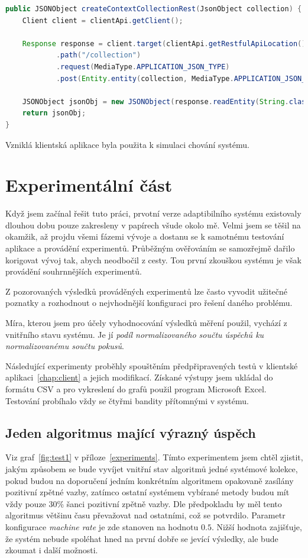 \documentclass[thesis=M,czech]{FITthesis}[2014/05/07]
\begin{document}
\begin{lstlisting}[language=java]
public JSONObject createContextCollectionRest(JsonObject collection) {
    Client client = clientApi.getClient();

    Response response = client.target(clientApi.getRestfulApiLocation())
            .path("/collection")
            .request(MediaType.APPLICATION_JSON_TYPE)
            .post(Entity.entity(collection, MediaType.APPLICATION_JSON_TYPE));

    JSONObject jsonObj = new JSONObject(response.readEntity(String.class));
    return jsonObj;
}
\end{lstlisting}

Vzniklá klientská aplikace byla použita k simulaci chování systému.

\chapter{Experimentální část}
\label{chap:tests}
Když jsem začínal řešit tuto práci, prvotní verze adaptibilního systému existovaly dlouhou dobu pouze zakresleny v papírech všude okolo mě. Velmi jsem se těšil na okamžik, až projdu všemi fázemi vývoje a dostanu se k samotnému testování aplikace a provádění experimentů. Průběžným ověřováním se samozřejmě dařilo korigovat vývoj tak, abych neodbočil z cesty. Tou první zkouškou systému je však provádění souhrnnějších experimentů.

Z pozorovaných výsledků prováděných experimentů lze často vyvodit užitečné poznatky a rozhodnout o nejvhodnější konfiguraci pro řešení daného problému.

Míra, kterou jsem pro účely vyhodnocování výsledků měření použil, vychází z vnitřního stavu systému. Je jí \emph{podíl normalizovaného součtu úspěchů ku normalizovanému součtu pokusů}.

Následující experimenty proběhly spouštěním předpřipravených testů v klientské aplikaci~\ref{chap:client} a jejich modifikací. Získané výstupy jsem ukládal do formátu CSV a pro vykreslení do grafů použil program Microsoft Excel. Testování probíhalo vždy se čtyřmi bandity přítomnými v systému.

\section{Jeden algoritmus mající výrazný úspěch}
Viz graf~\ref{fig:test1} v příloze~\ref{experiments}. Tímto experimentem jsem chtěl zjistit, jakým způsobem se bude vyvíjet vnitřní stav algoritmů jedné systémové kolekce, pokud budou na doporučení jedním konkrétním algoritmem opakovaně zasílány pozitivní zpětné vazby, zatímco ostatní systémem vybírané metody budou mít vždy pouze 30\% šanci pozitivní zpětně vazby. Dle předpokladu by měl tento algoritmus většinu času převažovat nad ostatními, což se potvrdilo. Parametr konfigurace \emph{machine rate} je zde stanoven na hodnotu $0.5$. Nižší hodnota zajišťuje, že systém nebude spoléhat hned na první dobře se jevící výsledky, ale bude zkoumat i další možnosti.
\end{document}
